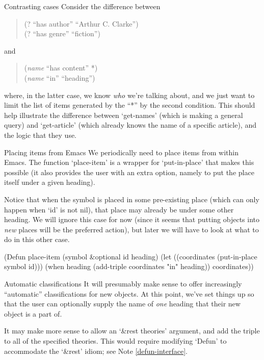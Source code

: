 \begin{notate}{Contrasting cases} \label{contrasting-cases}
Consider the difference between
\begin{quote}
(? ``has author'' ``Arthur C. Clarke'') \\
(? ``has genre'' ``fiction'')
\end{quote}
and
\begin{quote}
(\emph{name} ``has content'' *) \\
(\emph{name} ``in'' ``heading'')
\end{quote}
where, in the latter case, we know \emph{who} we're
talking about, and we just want to limit the list of items
generated by the ``*'' by the second condition.  This
should help illustrate the difference between `get-names'
(which is making a general query) and `get-article' (which
already knows the name of a specific article), and the
logic that they use.
\end{notate}

\begin{notate}{Placing items from Emacs} \label{place-item}
We periodically need to place items from within Emacs.
The function `place-item' is a wrapper for `put-in-place'
that makes this possible (it also provides the user with
an extra option, namely to put the place itself under a
given heading).

Notice that when the symbol is placed in some pre-existing
place (which can only happen when `id' is not nil), that
place may already be under some other heading.  We will ignore
this case for now (since it seems that putting objects
into \emph{new} places will be the preferred action), but
later we will have to look at what to do in this other
case.
\end{notate}

\begin{elisp}
(Defun place-item (symbol &optional id heading)
  (let ((coordinates (put-in-place symbol id)))
    (when heading (add-triple coordinates "in" heading))
    coordinates))
\end{elisp}

\begin{notate}{Automatic classifications} \label{classifications}
It will presumably make sense to offer increasingly
``automatic'' classifications for new objects.  At this
point, we've set things up so that the user can optionally
supply the name of \emph{one} heading that their new object
is a part of.

It may make more sense to allow an `\&rest theories'
argument, and add the triple to all of the specified
theories.  This would require modifying `Defun' to
accommodate the `\&rest' idiom; see Note
\ref{defun-interface}.
\end{notate}

